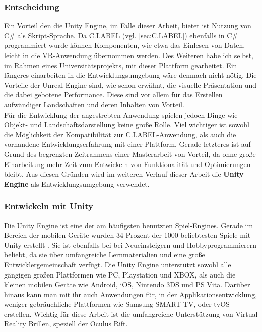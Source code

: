 \subsubsection{Entscheidung}
\label{sec:UnityDecision}
Ein Vorteil den die Unity Engine, im Falle dieser Arbeit, bietet ist Nutzung von C\# als Skript-Sprache. Da  
C.LABEL (vgl. \ref{sec:C.LABEL}) ebenfalls in C\# programmiert wurde können Komponenten, wie etwa das Einlesen von Daten, leicht in die VR-Anwendung übernommen werden. Des Weiteren habe ich selbst, im Rahmen eines Universitätsprojekts, mit dieser Plattform gearbeitet. Ein längeres einarbeiten in die Entwicklungsumgebung wäre demnach nicht nötig. Die Vorteile der Unreal Engine sind, wie schon erwähnt, die visuelle Präsentation und die dabei gebotene Performance. Diese sind vor allem für das Erstellen aufwändiger Landschaften und deren Inhalten von Vorteil. \\

Für die Entwicklung der angestrebten Anwendung spielen jedoch Dinge wie Objekt- und Landschaftsdarstellung keine große Rolle. Viel wichtiger ist sowohl die Möglichkeit der Kompatibilität zur C.LABEL-Anwendung, als auch die vorhandene Entwicklungserfahrung mit einer Plattform. Gerade letzteres ist auf Grund des begrenzten Zeitrahmens einer Masterarbeit von Vorteil, da ohne große Einarbeitung mehr Zeit zum Entwickeln von Funktionalität und Optimierungen bleibt. Aus diesen Gründen wird im weiteren Verlauf dieser Arbeit die \textbf{Unity Engine} als Entwicklungsumgebung verwendet.

\subsubsection{Entwickeln mit Unity}

Die Unity Engine ist eine der am häufigsten benutzten Spiel-Engines. Gerade im Bereich der mobilen Geräte wurden 34 Prozent der 1000 beliebtesten Spiele mit Unity erstellt \cite{bib:Unity34Percent}. Sie ist ebenfalls bei bei Neueinsteigern und Hobbyprogrammierern beliebt, da sie über umfangreiche Lernmaterialien und eine große Entwicklergemeinschaft verfügt. Die Unity Engine unterstützt sowohl alle gängigen großen Plattformen wie PC, Playstation und XBOX, als auch die kleinen mobilen Geräte wie Android, iOS, Nintendo 3DS und PS Vita. Darüber hinaus kann man mit ihr auch Anwendungen für, in der Applikationsentwicklung, weniger gebräuchliche Plattformen wie Samsung SMART TV, oder tvOS erstellen. Wichtig für diese Arbeit ist die umfangreiche Unterstützung von Virtual Reality Brillen, speziell der Oculus Rift.\\ 


